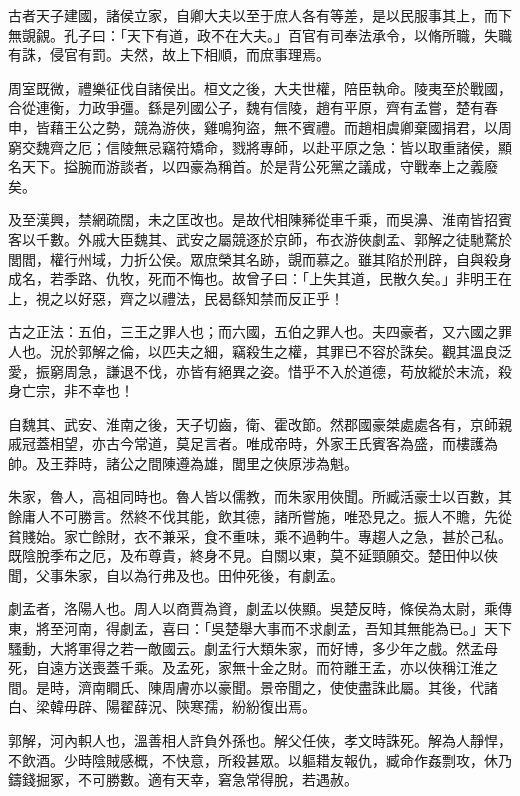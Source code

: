 
\begin{pinyinscope}
古者天子建國，諸侯立家，自卿大夫以至于庶人各有等差，是以民服事其上，而下無覬覦。孔子曰：「天下有道，政不在大夫。」百官有司奉法承令，以脩所職，失職有誅，侵官有罰。夫然，故上下相順，而庶事理焉。

周室既微，禮樂征伐自諸侯出。桓文之後，大夫世權，陪臣執命。陵夷至於戰國，合從連衡，力政爭彊。繇是列國公子，魏有信陵，趙有平原，齊有孟嘗，楚有春申，皆藉王公之勢，競為游俠，雞鳴狗盜，無不賓禮。而趙相虞卿棄國捐君，以周窮交魏齊之厄；信陵無忌竊符矯命，戮將專師，以赴平原之急：皆以取重諸侯，顯名天下。搤腕而游談者，以四豪為稱首。於是背公死黨之議成，守戰奉上之義廢矣。

及至漢興，禁網疏闊，未之匡改也。是故代相陳豨從車千乘，而吳濞、淮南皆招賓客以千數。外戚大臣魏其、武安之屬競逐於京師，布衣游俠劇孟、郭解之徒馳騖於閭閻，權行州域，力折公侯。眾庶榮其名跡，覬而慕之。雖其陷於刑辟，自與殺身成名，若季路、仇牧，死而不悔也。故曾子曰：「上失其道，民散久矣。」非明王在上，視之以好惡，齊之以禮法，民曷繇知禁而反正乎！

古之正法：五伯，三王之罪人也；而六國，五伯之罪人也。夫四豪者，又六國之罪人也。況於郭解之倫，以匹夫之細，竊殺生之權，其罪已不容於誅矣。觀其溫良泛愛，振窮周急，謙退不伐，亦皆有絕異之姿。惜乎不入於道德，苟放縱於末流，殺身亡宗，非不幸也！

自魏其、武安、淮南之後，天子切齒，衛、霍改節。然郡國豪桀處處各有，京師親戚冠蓋相望，亦古今常道，莫足言者。唯成帝時，外家王氏賓客為盛，而樓護為帥。及王莽時，諸公之間陳遵為雄，閭里之俠原涉為魁。

朱家，魯人，高祖同時也。魯人皆以儒教，而朱家用俠聞。所臧活豪士以百數，其餘庸人不可勝言。然終不伐其能，飲其德，諸所嘗施，唯恐見之。振人不贍，先從貧賤始。家亡餘財，衣不兼采，食不重味，乘不過軥牛。專趨人之急，甚於己私。既陰脫季布之厄，及布尊貴，終身不見。自關以東，莫不延頸願交。楚田仲以俠聞，父事朱家，自以為行弗及也。田仲死後，有劇孟。

劇孟者，洛陽人也。周人以商賈為資，劇孟以俠顯。吳楚反時，條侯為太尉，乘傳東，將至河南，得劇孟，喜曰：「吳楚舉大事而不求劇孟，吾知其無能為已。」天下騷動，大將軍得之若一敵國云。劇孟行大類朱家，而好博，多少年之戲。然孟母死，自遠方送喪蓋千乘。及孟死，家無十金之財。而符離王孟，亦以俠稱江淮之間。是時，濟南瞷氏、陳周膚亦以豪聞。景帝聞之，使使盡誅此屬。其後，代諸白、梁韓毋辟、陽翟薛況、陝寒孺，紛紛復出焉。

郭解，河內軹人也，溫善相人許負外孫也。解父任俠，孝文時誅死。解為人靜悍，不飲酒。少時陰賊感概，不快意，所殺甚眾。以軀耤友報仇，臧命作姦剽攻，休乃鑄錢掘冢，不可勝數。適有天幸，窘急常得脫，若遇赦。


\end{pinyinscope}
